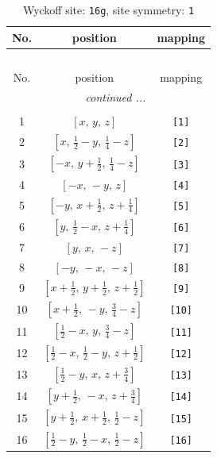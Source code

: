 \documentclass[fleqn,8pt]{jsarticle}
\begin{document}
\begin{longtable}{ccc}
\caption{Wyckoff site: {\tt 16g}, site symmetry: {\tt 1}}
 \\
 \hline \hline
No. & position & mapping \\ \hline \endfirsthead

\multicolumn{2}{l}{\tablename\ \thetable{}} \\
 \hline \hline
No. & position & mapping \\ \hline \endhead

 \hline \hline
\multicolumn{2}{r}{\footnotesize\it continued ...} \\ \endfoot

 \hline \hline
\multicolumn{2}{r}{} \\ \endlastfoot

1 & $\left[ x,\, y,\, z \right]$ & {\tt [1]} \\ \hline
2 & $\left[ x,\, \frac{1}{2} - y,\, \frac{1}{4} - z \right]$ & {\tt [2]} \\ \hline
3 & $\left[ - x,\, y + \frac{1}{2},\, \frac{1}{4} - z \right]$ & {\tt [3]} \\ \hline
4 & $\left[ - x,\, - y,\, z \right]$ & {\tt [4]} \\ \hline
5 & $\left[ - y,\, x + \frac{1}{2},\, z + \frac{1}{4} \right]$ & {\tt [5]} \\ \hline
6 & $\left[ y,\, \frac{1}{2} - x,\, z + \frac{1}{4} \right]$ & {\tt [6]} \\ \hline
7 & $\left[ y,\, x,\, - z \right]$ & {\tt [7]} \\ \hline
8 & $\left[ - y,\, - x,\, - z \right]$ & {\tt [8]} \\ \hline
9 & $\left[ x + \frac{1}{2},\, y + \frac{1}{2},\, z + \frac{1}{2} \right]$ & {\tt [9]} \\ \hline
10 & $\left[ x + \frac{1}{2},\, - y,\, \frac{3}{4} - z \right]$ & {\tt [10]} \\ \hline
11 & $\left[ \frac{1}{2} - x,\, y,\, \frac{3}{4} - z \right]$ & {\tt [11]} \\ \hline
12 & $\left[ \frac{1}{2} - x,\, \frac{1}{2} - y,\, z + \frac{1}{2} \right]$ & {\tt [12]} \\ \hline
13 & $\left[ \frac{1}{2} - y,\, x,\, z + \frac{3}{4} \right]$ & {\tt [13]} \\ \hline
14 & $\left[ y + \frac{1}{2},\, - x,\, z + \frac{3}{4} \right]$ & {\tt [14]} \\ \hline
15 & $\left[ y + \frac{1}{2},\, x + \frac{1}{2},\, \frac{1}{2} - z \right]$ & {\tt [15]} \\ \hline
16 & $\left[ \frac{1}{2} - y,\, \frac{1}{2} - x,\, \frac{1}{2} - z \right]$ & {\tt [16]} \\
\end{longtable}
\end{document}
